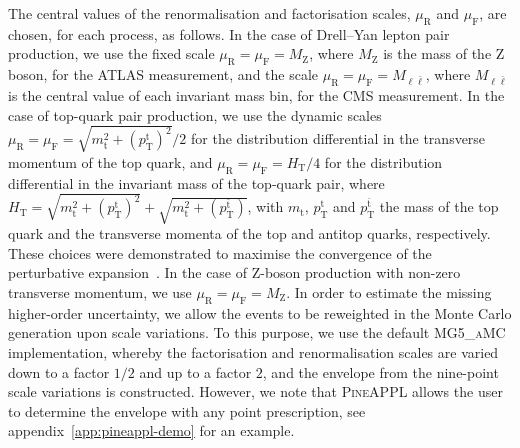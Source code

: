 The central values of the renormalisation and factorisation scales, $\mu_\mathrm{R}$ and
$\mu_\mathrm{F}$, are chosen, for each process, as follows. In the case of Drell--Yan
lepton pair production, we use the fixed scale $\mu_\mathrm{R}=\mu_\mathrm{F}=M_\mathrm{Z}$, where $M_\mathrm{Z}$ is
the mass of the Z boson, for the ATLAS measurement, and the scale
$\mu_\mathrm{R}=\mu_\mathrm{F}=M_{\ell\bar\ell}$, where $M_{\ell\bar\ell}$ is the central value of each
invariant mass bin, for the CMS measurement.
In the case of top-quark pair production, we use the dynamic scales
$\mu_\mathrm{R}=\mu_\mathrm{F}=\sqrt{m_\mathrm{t}^2+(p_\mathrm{T}^\mathrm{t})^2}{\Big /}2$ for the distribution differential
in the transverse momentum of the top quark, and $\mu_\mathrm{R}=\mu_\mathrm{F}=H_\mathrm{T}/4$ for the
distribution differential in the invariant mass of the top-quark pair, where
$H_\mathrm{T}=\sqrt{m_\mathrm{t}^2+(p_\mathrm{T}^\mathrm{t})^2}+\sqrt{m_\mathrm{t}^2+(p_\mathrm{T}^{\bar{\mathrm{t}}})}$, with $m_\mathrm{t}$,
$p_\mathrm{T}^\mathrm{t}$ and $p_\mathrm{T}^{\bar{\mathrm{t}}}$ the mass of the top quark and the transverse momenta
of the top and antitop quarks, respectively. These choices were demonstrated
to maximise the convergence of the perturbative expansion~\cite{Czakon:2016dgf}.
In the case of Z-boson production with non-zero transverse momentum, we use
$\mu_\mathrm{R}=\mu_\mathrm{F}=M_\mathrm{Z}$. In order to estimate the missing higher-order uncertainty,
we allow the events to be reweighted in the Monte Carlo generation upon scale
variations. To this purpose, we use the default \textsc{MG5\_aMC}
implementation, whereby the factorisation and renormalisation scales
are varied down to a factor $1/2$ and up to a factor $2$, and the envelope
from the nine-point scale variations is constructed. However, we note that
\textsc{PineAPPL} allows the user to determine the envelope with any point
prescription, see appendix~\ref{app:pineappl-demo} for an example.

